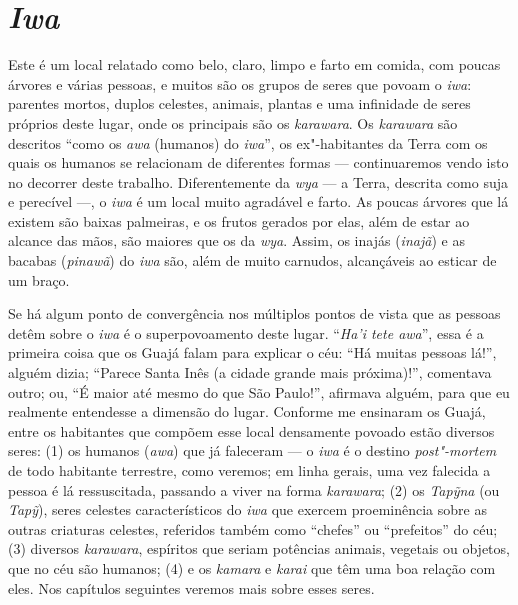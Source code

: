 \section{\emph{Iwa}}\label{iwa}

Este é um local relatado como belo, claro, limpo e farto em comida, com
poucas árvores e várias pessoas, e muitos são os grupos de seres que
povoam o \emph{iwa}: parentes mortos, duplos celestes, animais, plantas
e uma infinidade de seres próprios deste lugar, onde os principais são
os \emph{karawara}. Os \emph{karawara} são descritos ``como os \emph{awa}
(humanos) do \emph{iwa}'', os ex"-habitantes da Terra com os quais os
humanos se relacionam de diferentes formas --- continuaremos vendo isto no
decorrer deste trabalho. Diferentemente da \emph{wya} --- a Terra,
descrita como suja e perecível ---, o \emph{iwa} é um local muito
agradável e farto. As poucas árvores que lá existem são baixas
palmeiras, e os frutos gerados por elas, além de estar ao alcance das
mãos, são maiores que os da \emph{wya}. Assim, os inajás (\emph{inajã})
e as bacabas (\emph{pinawã}) do \emph{iwa} são, além de muito carnudos,
alcançáveis ao esticar de um braço.

Se há algum ponto de convergência nos múltiplos pontos de vista que as
pessoas detêm sobre o \emph{iwa} é o superpovoamento deste lugar.
``\emph{Ha'i tete awa}'', essa é a primeira coisa que os Guajá falam para
explicar o céu: ``Há muitas pessoas lá!'', alguém dizia; ``Parece Santa
Inês (a cidade grande mais próxima)!'', comentava outro; ou, ``É maior até
mesmo do que São Paulo!'', afirmava alguém, para que eu realmente
entendesse a dimensão do lugar. Conforme me ensinaram os Guajá, entre os
habitantes que compõem esse local densamente povoado estão diversos
seres: (1) os humanos (\emph{awa}) que já faleceram --- o \emph{iwa} é o
destino \emph{post"-mortem} de todo habitante terrestre, como veremos; em
linha gerais, uma vez falecida a pessoa é lá ressuscitada, passando a
viver na forma \emph{karawara}; (2) os \emph{Tapỹna} (ou \emph{Tapỹ}),
seres celestes característicos do \emph{iwa} que exercem proeminência
sobre as outras criaturas celestes, referidos também como ``chefes'' ou
``prefeitos'' do céu; (3) diversos \emph{karawara}, espíritos que seriam
potências animais, vegetais ou objetos, que no céu são humanos; (4) e os
\emph{kamara} e \emph{karai} que têm uma boa relação com eles. Nos
capítulos seguintes veremos mais sobre esses seres.

